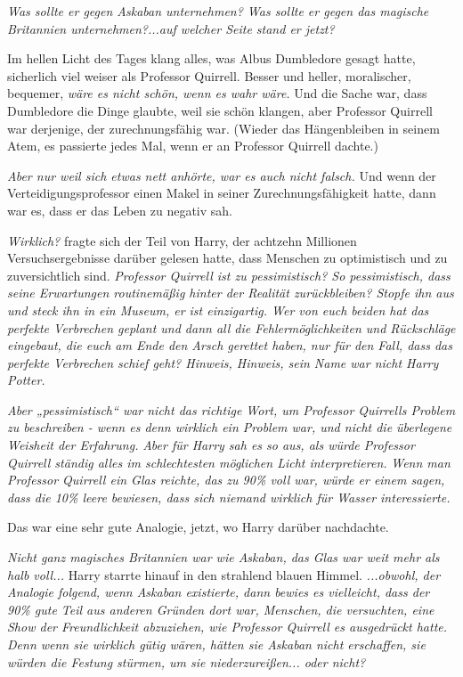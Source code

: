 {\emph{Was sollte er gegen Askaban unternehmen? Was sollte er gegen das magische Britannien unternehmen?...auf welcher Seite stand er jetzt?}

Im hellen Licht des Tages klang alles, was Albus Dumbledore gesagt hatte, sicherlich viel weiser als Professor Quirrell. Besser und heller, moralischer, bequemer, \emph{wäre es nicht schön, wenn es wahr wäre.} Und die Sache war, dass Dumbledore die Dinge glaubte, weil sie schön klangen, aber Professor Quirrell war derjenige, der zurechnungsfähig war. (Wieder das Hängenbleiben in seinem Atem, es passierte jedes Mal, wenn er an Professor Quirrell dachte.)

\emph{Aber nur weil sich etwas nett anhörte, war es auch nicht falsch.} Und wenn der Verteidigungsprofessor einen Makel in seiner Zurechnungsfähigkeit hatte, dann war es, dass er das Leben zu negativ sah.

\emph{Wirklich?} fragte sich der Teil von Harry, der achtzehn Millionen Versuchsergebnisse darüber gelesen hatte, dass Menschen zu optimistisch und zu zuversichtlich sind. \emph{Professor Quirrell ist zu pessimistisch? So pessimistisch, dass seine Erwartungen routinemäßig hinter der Realität zurückbleiben? Stopfe ihn aus und steck ihn in ein Museum, er ist einzigartig. Wer von euch beiden hat das perfekte Verbrechen geplant und dann all die Fehlermöglichkeiten und Rückschläge eingebaut, die euch am Ende den Arsch gerettet haben, nur für den Fall, dass das perfekte Verbrechen schief geht? Hinweis, Hinweis, sein Name war nicht Harry Potter.}

\emph{Aber „pessimistisch“ war nicht das richtige Wort, um Professor Quirrells Problem zu beschreiben - wenn es denn wirklich ein Problem war, und nicht die überlegene Weisheit der Erfahrung.} \emph{Aber für Harry sah es so aus, als würde Professor Quirrell ständig alles im schlechtesten möglichen Licht interpretieren.} \emph{Wenn man Professor Quirrell ein Glas reichte, das zu 90\% voll war, würde er einem sagen, dass die 10\% leere bewiesen, dass sich niemand wirklich für Wasser interessierte.}

Das war eine sehr gute Analogie, jetzt, wo Harry darüber nachdachte.

\emph{Nicht ganz magisches Britannien war wie Askaban, das Glas war weit mehr als halb voll...} Harry starrte hinauf in den strahlend blauen Himmel. \emph{...obwohl, der Analogie folgend, wenn Askaban existierte, dann bewies es vielleicht, dass der 90\% gute Teil aus anderen Gründen dort war, Menschen, die versuchten, eine Show der Freundlichkeit abzuziehen, wie Professor Quirrell es ausgedrückt hatte. Denn wenn sie wirklich gütig wären, hätten sie Askaban nicht erschaffen, sie würden die Festung stürmen, um sie niederzureißen... oder nicht?}

}
